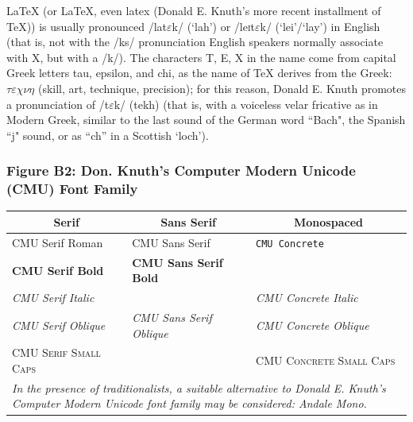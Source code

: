 \documentclass[11pt, english]{article}
\begin{document}
		{\LaTeX} (or LaTeX, even latex (Donald E. Knuth's more recent installment of {\TeX})) is usually pronounced /la\textlengthmark t$\varepsilon$k/ (`lah') or /le\textsc{i}t$\varepsilon$k/ (`lei'/`lay') in English (that is, not with the /ks/ pronunciation English speakers normally associate with X, but with a /k/). The characters T, E, X in the name come from capital Greek letters tau, epsilon, and chi, as the name of {\TeX} derives from the Greek: $\tau\varepsilon\chi\nu\eta$ (skill, art, technique, precision); for this reason, Donald E. Knuth promotes a pronunciation of /t$\varepsilon$k/ (tekh) (that is, with a voiceless velar fricative as in Modern Greek, similar to the last sound of the German word ``Bach", the Spanish ``j" sound, or as ``ch'' in a Scottish `loch'). 

		\subsubsection*{Figure B2: Don. Knuth's Computer Modern Unicode (CMU) Font Family}

		\begin{table}[h]
			\scriptsize
			\renewcommand{\arraystretch}{1.25}
		\begin{center}
		\begin{tabular}{p{4cm}p{4cm}p{4cm}}
			\hline
			\multicolumn{1}{c}{\textbf{Serif}} & \multicolumn{1}{c}{\textbf{Sans Serif}} & \multicolumn{1}{c}{\textbf{Monospaced}}\\
			\hline
			CMU Serif Roman & \textsf{CMU Sans Serif} & \texttt{CMU Concrete}\\
			\textbf{CMU Serif Bold} & \sffamily \textbf{CMU Sans Serif Bold} & \\ 
				\textit{CMU Serif Italic} & & \ttfamily \textit{CMU Concrete Italic}\\
			\textsl{CMU Serif Oblique} & \sffamily \textsl{CMU Sans Serif Oblique} & \ttfamily \textsl{CMU Concrete Oblique}\\
				\textsc{CMU Serif Small Caps} & & \ttfamily \textsc{CMU Concrete Small Caps}\\
			\hline
				\multicolumn{3}{p{13cm}}{\textit{In the presence of traditionalists, a suitable alternative to Donald E. Knuth's Computer Modern Unicode font family may be considered: Andale Mono.}}\\
			\hline
		\end{tabular}
		\end{center}
		\end{table}
\end{document}
